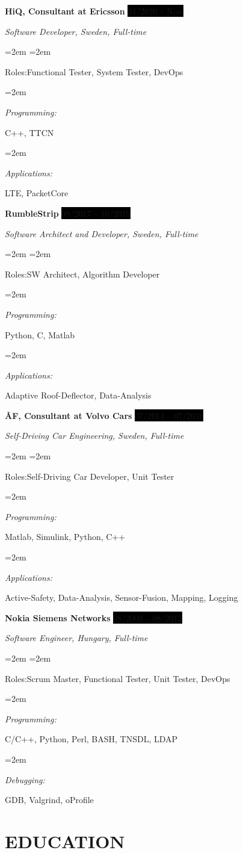 \documentclass[paper=a4,fontsize=11pt]{scrartcl}	 			%
\newlength{\spacebox}
\newcommand{\sepspace}{\vspace*{1em}}			%
\newcommand{\NewPart}[1]{\section*{\uppercase{#1}}}
\newcommand{\PersonalEntry}[2]{
		\noindent\hangindent=2em\hangafter=0 		%
		\parbox{\spacebox}{						%
		\textit{#1}}								%
		\hspace{1.5em} #2 \par}					%
\newcommand{\SkillsEntry}[2]{						%
		\noindent\hangindent=2em\hangafter=0 		%
		\parbox{\spacebox}{						%
		\textit{#1}}								%
		\hspace{1.5em} #2 \par}					%
\newcommand{\EducationEntry}[4]{
		\noindent \textbf{#1} \par 					%
		\noindent \textit{#3} \hfill				%
		\colorbox{Black}{%
			\hfill\color{White}#2} \par				%
		\noindent\hangindent=2em\hangafter=0 \small #4 	%
		\normalsize \par
    }
\newcommand{\WorkEntry}[4]{					        %
		\noindent \textbf{#1} \hfill 				%
		\colorbox{Black}{\color{White}#2} \par		%
		\noindent \textit{#3} \par					%
		\noindent\hangindent=2em\hangafter=0 \small #4 	%
		\normalsize \par}
\begin{document}
\WorkEntry{HiQ, Consultant at Ericsson}{04/2020 -- Now}{Software Developer, Sweden, Full-time}

\SkillsEntry{Roles:}{Functional Tester, System Tester, DevOps}

\SkillsEntry{Programming:}{C++, TTCN}

\SkillsEntry{Applications:}{LTE, PacketCore}


\sepspace

\WorkEntry{RumbleStrip}{09/2017 -- 10/2019}{Software Architect and Developer, Sweden, Full-time}

\SkillsEntry{Roles:}{SW Architect, Algorithm Developer}

\SkillsEntry{Programming:}{Python, C, Matlab}

\SkillsEntry{Applications:}{Adaptive Roof-Deflector, Data-Analysis}


\sepspace

\WorkEntry{ÅF, Consultant at Volvo Cars}{07/2014 -- 07/2016}{Self-Driving Car Engineering, Sweden, Full-time}

\SkillsEntry{Roles:}{Self-Driving Car Developer, Unit Tester}

\SkillsEntry{Programming:}{Matlab, Simulink, Python, C++}

\SkillsEntry{Applications:}{Active-Safety, Data-Analysis, Sensor-Fusion, Mapping, Logging}


\sepspace

\WorkEntry{Nokia Siemens Networks}{08/2009 -- 08/2012}{Software Engineer, Hungary, Full-time}

\SkillsEntry{Roles:}{Scrum Master, Functional Tester, Unit Tester, DevOps}

\SkillsEntry{Programming:}{C/C++, Python, Perl, BASH, TNSDL, LDAP}


\SkillsEntry{Debugging:}{GDB, Valgrind, oProfile}


\clearpage

\NewPart{Education}{}
\end{document}

